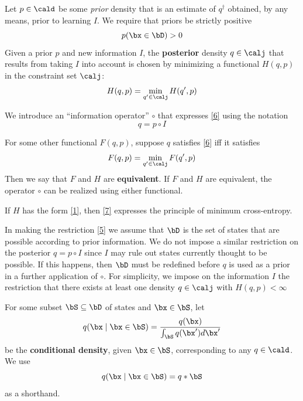 \documentclass[11pt]{article}
\begin{document}
Let \(p\in\cald\) be some \emph{prior} density that is an estimate of \(q^\dag\) obtained, by any means,
prior to learning \(I\). We require that priors be strictly positive
\begin{equation}
\label{5}
p(\bx\in\bD)>0
\end{equation}
Given a prior \(p\) and new information \(I\), the \textbf{posterior} density \(q\in\calj\) that results from
taking \(I\) into account is chosen by minimizing a functional \(H(q,p)\) in the constraint set
\(\calj\):
\begin{equation}
\label{6}
H(q,p)=\min_{q'\in\calj}H(q',p)
\end{equation}

We introduce an ``information operator'' \(\circ\) that expresses \eqref{6} using the notation
\begin{equation*}
q=p\circ I
\end{equation*}

For some other functional \(F(q,p)\), suppose \(q\) satisfies \eqref{6} iff it satisfies
\begin{equation*}
F(q,p)=\min_{q'\in\calj}F(q',p)
\end{equation*}
Then we say that \(F\) and \(H\) are \textbf{equivalent}. If \(F\) and \(H\) are equivalent, the operator
\(\circ\) can be realized using either functional.

If \(H\) has the form \eqref{1}, then \eqref{7} expresses the principle of minimum cross-entropy.

In making the restriction \eqref{5} we assume that \(\bD\) is the set of states that are possible
according to prior information. We do not impose a similar restriction on the posterior \(q=p\circ I\)
since \(I\) may rule out states currently thought to be possible. If this happens, then \(\bD\) must
be redefined before \(q\) is used as a prior in a further application of \(\circ\). For simplicity, we
impose on the information \(I\) the restriction that there exists at least one density \(q\in\calj\)
with \(H(q,p)<\infty\)

For some subset \(\bS\subseteq\bD\) of states and \(\bx\in\bS\), let
\begin{equation*}
q(\bx\mid\bx\in\bS)=\frac{q(\bx)}{\int_{\bS}q(\bx')d\bx'}
\end{equation*}
be the \textbf{conditional density}, given \(\bx\in\bS\), corresponding to any \(q\in\cald\). We use
\begin{equation*}
q(\bx\mid\bx\in\bS)=q*\bS
\end{equation*}
as a shorthand.
\end{document}
